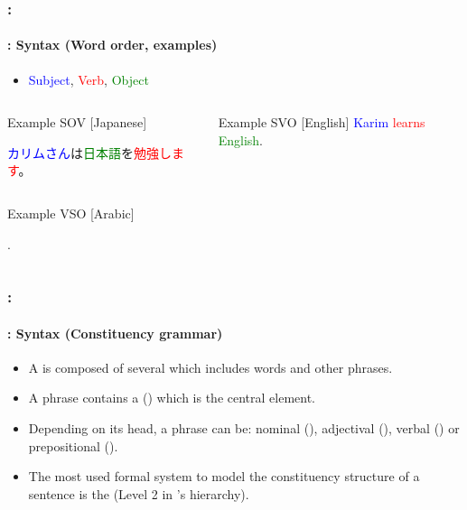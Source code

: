 \documentclass[xcolor=table]{beamer}
\begin{document}
\begin{frame}
	\frametitle{\insertshortsubtitle: \insertsection}
	\framesubtitle{\insertsubsection: Syntax (Word order, examples)}

	\begin{itemize}
		\item \textcolor{blue}{Subject}, \textcolor{red}{Verb}, \textcolor{green}{Object}
	\end{itemize}
	
	\begin{columns}
	\begin{column}{0.52\textwidth}
		\begin{exampleblock}{Example SOV [Japanese]}
			\begin{CJK}{UTF8}{min}
				\textcolor{blue}{カリムさん}は\textcolor{green}{日本語}を\textcolor{red}{勉強します}。
			\end{CJK}
		\end{exampleblock}
	\end{column}
	\begin{column}{0.42\textwidth}
		\begin{exampleblock}{Example SVO [English]}
			\textcolor{blue}{Karim} \textcolor{red}{learns} \textcolor{green}{English}.
		\end{exampleblock}
	\end{column}%
	\end{columns}
	\begin{columns}
	\begin{column}{0.49\textwidth}
		\begin{exampleblock}{Example VSO [Arabic]}
			\begin{flushright}
				\color{black}.
				\color{green} \RL{al-`rbyT}%
				\color{blue} \RL{krym} 
				\color{red} \RL{yt`llm} 
			\end{flushright}
		\end{exampleblock}
	\end{column}
	\end{columns}

\end{frame}

\begin{frame}
	\frametitle{\insertshortsubtitle: \insertsection}
	\framesubtitle{\insertsubsection: Syntax (Constituency grammar)}

	\begin{itemize}
		\item A  is composed of several  which includes words and other phrases.
		\item A phrase contains a  () which is the central element.
		\item Depending on its head, a phrase can be: nominal (), adjectival (), verbal () or prepositional ().
		\item The most used formal system to model the constituency structure of a sentence is the  (Level 2 in 's hierarchy).
	\end{itemize}

\end{frame}
\end{document}
